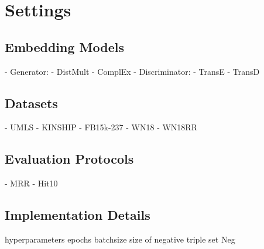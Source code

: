 \section{Settings}

\subsection{Embedding Models}
- Generator:
    - DistMult
    - ComplEx
- Discriminator:
    - TransE
    - TransD
    
    
\subsection{Datasets}

- UMLS
- KINSHIP
- FB15k-237
- WN18
- WN18RR


\subsection{Evaluation Protocols}

- MRR
- Hit\@10

\subsection{Implementation Details}
hyperparameters
epochs
batchsize
size of negative triple set Neg